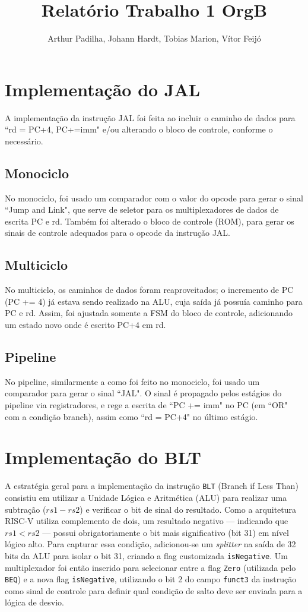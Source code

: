 \documentclass{article}
\title{Relatório Trabalho 1 OrgB}
\author{Arthur Padilha, Johann Hardt, Tobias Marion, Vítor Feijó}
\date{}
\begin{document}
\maketitle

\section{Implementação do JAL}
A implementação da instrução JAL foi feita ao incluir o caminho de dados para ``rd = PC+4, PC+=imm" e/ou alterando o bloco de controle, conforme o necessário.

\subsection{Monociclo}
No monociclo, foi usado um comparador com o valor do opcode para gerar o sinal ``Jump and Link", que serve de seletor para os multiplexadores de dados de escrita PC e rd. Também foi alterado o bloco de controle (ROM), para gerar os sinais de controle adequados para o opcode da instrução JAL.

\subsection{Multiciclo}
No multiciclo, os caminhos de dados foram reaproveitados; o incremento de PC (PC += 4) já estava sendo realizado na ALU, cuja saída já possuía caminho para PC e rd. Assim, foi ajustada somente a FSM do bloco de controle, adicionando um estado novo onde é escrito PC+4 em rd.

\subsection{Pipeline}
No pipeline, similarmente a como foi feito no monociclo, foi usado um comparador para gerar o sinal ``JAL". O sinal é propagado pelos estágios do pipeline via registradores, e rege a escrita de ``PC += imm" no PC (em ``OR" com a condição branch), assim como ``rd = PC+4" no último estágio.

\section{Implementação do BLT}
A estratégia geral para a implementação da instrução \texttt{BLT} (Branch if Less Than) consistiu em utilizar a Unidade Lógica e Aritmética (ALU) para realizar uma subtração ($rs1 - rs2$) e verificar o bit de sinal do resultado. Como a arquitetura RISC-V utiliza complemento de dois, um resultado negativo — indicando que $rs1 < rs2$ — possui obrigatoriamente o bit mais significativo (bit 31) em nível lógico alto. Para capturar essa condição, adicionou-se um \textit{splitter} na saída de 32 bits da ALU para isolar o bit 31, criando a flag customizada \texttt{isNegative}. Um multiplexador foi então inserido para selecionar entre a flag \texttt{Zero} (utilizada pelo \texttt{BEQ}) e a nova flag \texttt{isNegative}, utilizando o bit 2 do campo \texttt{funct3} da instrução como sinal de controle para definir qual condição de salto deve ser enviada para a lógica de desvio.
\end{document}
